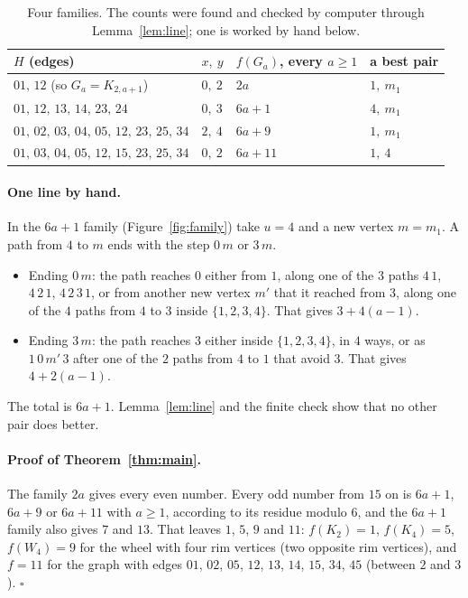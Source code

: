 \documentclass[11pt]{article}
\theoremstyle{remark}
\begin{document}
\begin{table}[ht]
\centering
\begin{tabular}{llll}
\toprule
$H$ (edges) & $x,\ y$ & $f(G_a)$, every $a\ge1$ & a best pair\\
\midrule
$01,\,12$ \quad (so $G_a=K_{2,a+1}$) & $0,\ 2$ & $2a$ & $1,\ m_1$\\
$01,\,12,\,13,\,14,\,23,\,24$ & $0,\ 3$ & $6a+1$ & $4,\ m_1$\\
$01,\,02,\,03,\,04,\,05,\,12,\,23,\,25,\,34$ & $2,\ 4$ & $6a+9$ & $1,\ m_1$\\
$01,\,03,\,04,\,05,\,12,\,15,\,23,\,25,\,34$ & $0,\ 2$ & $6a+11$ & $1,\ 4$\\
\bottomrule
\end{tabular}
\caption{Four families. The counts were found and checked by computer through Lemma~\ref{lem:line}; one is
worked by hand below.}
\label{tab:families}
\end{table}

\paragraph{One line by hand.} In the $6a+1$ family (Figure~\ref{fig:family}) take $u=4$ and a new vertex
$m=m_1$. A path from $4$ to $m$ ends with the step $0\,m$ or $3\,m$.
\begin{itemize}
\item Ending $0\,m$: the path reaches $0$ either from $1$, along one of the $3$ paths $4\,1$, $4\,2\,1$,
$4\,2\,3\,1$, or from another new vertex $m'$ that it reached from $3$, along one of the $4$ paths from $4$ to
$3$ inside $\{1,2,3,4\}$. That gives $3+4(a-1)$.
\item Ending $3\,m$: the path reaches $3$ either inside $\{1,2,3,4\}$, in $4$ ways, or as $1\,0\,m'\,3$ after
one of the $2$ paths from $4$ to $1$ that avoid $3$. That gives $4+2(a-1)$.
\end{itemize}
The total is $6a+1$. Lemma~\ref{lem:line} and the finite check show that no other pair does better.

\paragraph{Proof of Theorem~\ref{thm:main}.} The family $2a$ gives every even number. Every odd number from
$15$ on is $6a+1$, $6a+9$ or $6a+11$ with $a\ge1$, according to its residue modulo $6$, and the $6a+1$ family
also gives $7$ and $13$. That leaves $1$, $5$, $9$ and $11$: $f(K_2)=1$, $f(K_4)=5$, $f(W_4)=9$ for the wheel
with four rim vertices (two opposite rim vertices), and $f=11$ for the graph with edges $01$, $02$, $05$,
$12$, $13$, $14$, $15$, $34$, $45$ (between $2$ and $3$). $\square$
\end{document}
